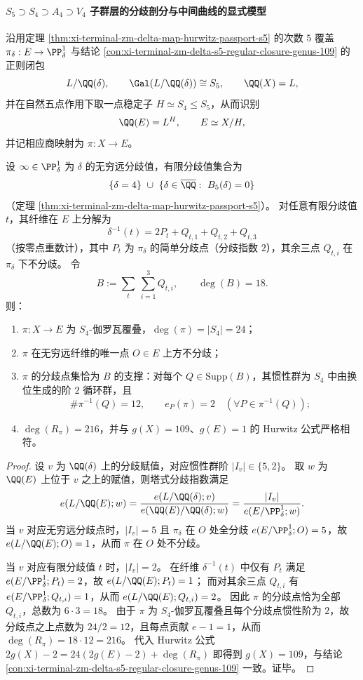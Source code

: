 \paragraph{\texorpdfstring{$S_5\supset S_4\supset A_4\supset V_4$}{S5>S4>A4>V4} 子群层的分歧剖分与中间曲线的显式模型}
沿用定理 \ref{thm:xi-terminal-zm-delta-map-hurwitz-passport-s5} 的次数 \(5\) 覆盖
\(\pi_\delta:E\to\PP^1_\delta\) 与结论 \ref{con:xi-terminal-zm-delta-s5-regular-closure-genus-109} 的正则闭包
\[
L/\QQ(\delta),\qquad \Gal(L/\QQ(\delta))\cong S_5,\qquad \QQ(X)=L,
\]
并在自然五点作用下取一点稳定子 \(H\simeq S_4\le S_5\)，从而识别
\[
\QQ(E)=L^{H},\qquad E\simeq X/H,
\]
并记相应商映射为 \(\pi:X\to E\)。

\begin{conclusion}\label{con:xi-terminal-zm-delta-s4-layer-branch-decomposition-18}
设 \(\infty\in\PP^1_\delta\) 为 \(\delta\) 的无穷远分歧值，有限分歧值集合为
\[
\{\delta=4\}\ \cup\ \{\delta\in\overline{\QQ}:\ B_5(\delta)=0\}
\]
（定理 \ref{thm:xi-terminal-zm-delta-map-hurwitz-passport-s5}）。
对任意有限分歧值 \(t\)，其纤维在 \(E\) 上分解为
\[
\delta^{-1}(t)=2P_t+Q_{t,1}+Q_{t,2}+Q_{t,3}
\]
（按零点重数计），其中 \(P_t\) 为 \(\pi_\delta\) 的简单分歧点（分歧指数 \(2\)），其余三点 \(Q_{t,i}\) 在 \(\pi_\delta\) 下不分歧。
令
\[
B:=\sum_{t}\ \sum_{i=1}^{3} Q_{t,i},\qquad \deg(B)=18.
\]
则：
\begin{enumerate}
  \item \(\pi:X\to E\) 为 \(S_4\)-伽罗瓦覆叠，\(\deg(\pi)=|S_4|=24\)；
  \item \(\pi\) 在无穷远纤维的唯一点 \(O\in E\) 上方不分歧；
  \item \(\pi\) 的分歧点集恰为 \(B\) 的支撑：对每个 \(Q\in \mathrm{Supp}(B)\)，其惯性群为 \(S_4\) 中由换位生成的阶 \(2\) 循环群，且
  \[
  \#\pi^{-1}(Q)=12,\qquad e_P(\pi)=2\quad(\forall P\in\pi^{-1}(Q));
  \]
  \item \(\deg(R_\pi)=216\)，并与 \(g(X)=109\)、\(g(E)=1\) 的 Hurwitz 公式严格相符。
\end{enumerate}
\end{conclusion}
\begin{proof}
设 \(v\) 为 \(\QQ(\delta)\) 上的分歧赋值，对应惯性群阶 \(|I_v|\in\{5,2\}\)。
取 \(w\) 为 \(\QQ(E)\) 上位于 \(v\) 之上的赋值，则塔式分歧指数满足
\[
e(L/\QQ(E);w)=\frac{e(L/\QQ(\delta);v)}{e(\QQ(E)/\QQ(\delta);w)}
=\frac{|I_v|}{e(E/\PP^1_\delta;w)}.
\]
当 \(v\) 对应无穷远分歧点时，\(|I_v|=5\) 且 \(\pi_\delta\) 在 \(O\) 处全分歧 \(e(E/\PP^1_\delta;O)=5\)，故 \(e(L/\QQ(E);O)=1\)，从而 \(\pi\) 在 \(O\) 处不分歧。
\par
当 \(v\) 对应有限分歧值 \(t\) 时，\(|I_v|=2\)。
在纤维 \(\delta^{-1}(t)\) 中仅有 \(P_t\) 满足 \(e(E/\PP^1_\delta;P_t)=2\)，故 \(e(L/\QQ(E);P_t)=1\)；
而对其余三点 \(Q_{t,i}\) 有 \(e(E/\PP^1_\delta;Q_{t,i})=1\)，从而 \(e(L/\QQ(E);Q_{t,i})=2\)。
因此 \(\pi\) 的分歧点恰为全部 \(Q_{t,i}\)，总数为 \(6\cdot 3=18\)。
由于 \(\pi\) 为 \(S_4\)-伽罗瓦覆叠且每个分歧点惯性阶为 \(2\)，故分歧点之上点数为 \(24/2=12\)，且每点贡献 \(e-1=1\)，从而 \(\deg(R_\pi)=18\cdot 12=216\)。
代入 Hurwitz 公式
\(
2g(X)-2=24(2g(E)-2)+\deg(R_\pi)
\)
即得到 \(g(X)=109\)，与结论 \ref{con:xi-terminal-zm-delta-s5-regular-closure-genus-109} 一致。证毕。
\end{proof}

